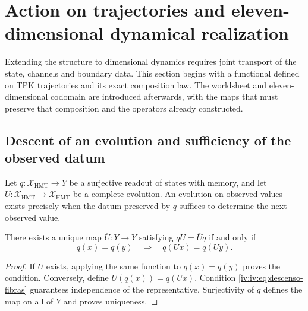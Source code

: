 \section{Action on trajectories and eleven-dimensional dynamical realization}
\label{iv:iv:accion-realizacion}

Extending the structure to dimensional dynamics requires
joint transport of the state, channels and boundary
data. This section begins with a functional defined on
TPK trajectories and its exact composition law.
The worldsheet and eleven-dimensional codomain are
introduced afterwards, with the maps that must preserve that
composition and the operators already constructed.

\subsection{Descent of an evolution and sufficiency of the observed datum}

Let \(q:\mathcal X_{\mathrm{HMT}}\to Y\) be a surjective
readout of states with memory, and let
\(U:\mathcal X_{\mathrm{HMT}}\to\mathcal X_{\mathrm{HMT}}\)
be a complete evolution. An evolution on observed
values exists precisely when the datum preserved by
\(q\) suffices to determine the next observed value.

\begin{theorem}
\label{iv:iv:thm:descenso-fibras}
There exists a unique map \(\overline U:Y\to Y\)
satisfying \(qU=\overline Uq\) if and only if
\begin{equation}
 q(x)=q(y)\quad\Longrightarrow\quad q(Ux)=q(Uy).
 \label{iv:iv:eq:descenso-fibras}
\end{equation}
\end{theorem}
\begin{proof}
If \(\overline U\) exists, applying the same function to
\(q(x)=q(y)\) proves the condition. Conversely,
define \(\overline U(q(x))=q(Ux)\). Condition
\eqref{iv:iv:eq:descenso-fibras} guarantees independence of the
representative. Surjectivity of \(q\) defines the
map on all of \(Y\) and proves uniqueness.
\end{proof}

